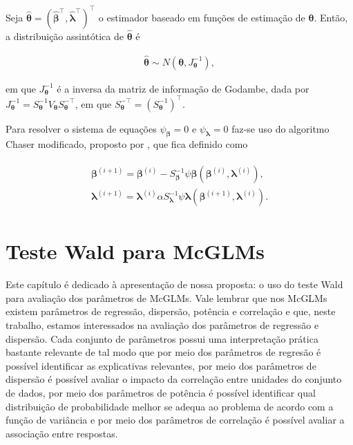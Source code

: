 \documentclass[AMA,STIX1COL]{WileyNJD-v2}
\begin{document}
Seja $\boldsymbol{\hat{\theta}} = (\boldsymbol{\hat{\beta}^{\top}}, \boldsymbol{\hat{\lambda}^{\top}})^{\top}$ o estimador baseado em funções de estimação de $\boldsymbol{\theta}$. Então, a distribuição assintótica de $\boldsymbol{\hat{\theta}}$ é

\begin{equation}
  \begin{aligned}
    \boldsymbol{\hat{\theta}} \sim N(\boldsymbol{\theta}, J_{\boldsymbol{\theta}}^{-1}),
  \end{aligned}
\end{equation}

\noindent em que $J_{\boldsymbol{\theta}}^{-1}$ é a inversa da matriz de informação de Godambe, dada por $J_{\boldsymbol{\theta}}^{-1} = S_{\boldsymbol{\theta}}^{-1} V_{\boldsymbol{\theta}} S_{\boldsymbol{\theta}}^{-\top}$, em que $S_{\boldsymbol{\theta}}^{-\top} = (S_{\boldsymbol{\theta}}^{-1})^{\top}.$

Para resolver o sistema de equações $\psi_{\boldsymbol{\beta}} = 0$ e $\psi_{\boldsymbol{\lambda}} = 0$ faz-se uso do algoritmo Chaser modificado, proposto por \citet{jorg04}, que fica definido como

\begin{equation}
\begin{aligned}
\begin{matrix}
\boldsymbol{\beta}^{(i+1)} = \boldsymbol{\beta}^{(i)}- S_{\boldsymbol{\beta}}^{-1} \psi \boldsymbol{\beta} (\boldsymbol{\beta}^{(i)}, \boldsymbol{\lambda}^{(i)}), \\ 
\boldsymbol{\lambda}^{(i+1)} = \boldsymbol{\lambda}^{(i)}\alpha S_{\boldsymbol{\lambda}}^{-1} \psi \boldsymbol{\lambda} (\boldsymbol{\beta}^{(i+1)}, \boldsymbol{\lambda}^{(i)}).
\end{matrix}
\end{aligned}
\end{equation}


\section{Teste Wald para McGLMs}\label{sec4}

Este capítulo é dedicado à apresentação de nossa proposta: o uso do teste Wald para avaliação dos parâmetros de McGLMs. Vale lembrar que nos McGLMs existem parâmetros de regressão, dispersão, potência e correlação e que, neste trabalho, estamos interessados na avaliação dos parâmetros de regressão e dispersão. Cada conjunto de parâmetros possui uma interpretação prática bastante relevante de tal modo que por meio dos parâmetros de regresão é possível identificar as explicativas relevantes, por meio dos parâmetros de dispersão é possível avaliar o impacto da correlação entre unidades do conjunto de dados, por meio dos parâmetros de potência é possível identificar qual distribuição de probabilidade melhor se adequa ao problema de acordo com a função de variância e por meio dos parâmetros de correlação é possível avaliar a associação entre respostas.
\end{document}

